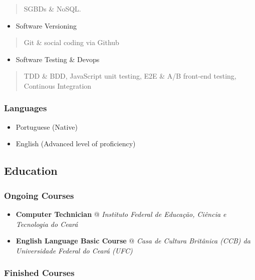 \documentclass[]{article}
\providecommand{\tightlist}{%
  \setlength{\itemsep}{0pt}\setlength{\parskip}{0pt}}
\begin{document}
\begin{quote}
SGBDs \& NoSQL.
\end{quote}

\begin{itemize}
\tightlist
\item
  Software Versioning
\end{itemize}

\begin{quote}
Git \& social coding via Github
\end{quote}

\begin{itemize}
\tightlist
\item
  Software Testing \& Devops
\end{itemize}

\begin{quote}
TDD \& BDD, JavaScript unit testing, E2E \& A/B front-end testing,
Continous Integration
\end{quote}

\subsubsection{Languages}\label{languages}

\begin{itemize}
\item
  Portuguese (Native)
\item
  English (Advanced level of proficiency)
\end{itemize}

\subsection{Education}\label{education}

\subsubsection{Ongoing Courses}\label{ongoing-courses}

\begin{itemize}
\item
  \textbf{Computer Technician} @ \emph{Instituto Federal de Educação,
  Ciência e Tecnologia do Ceará}
\item
  \textbf{English Language Basic Course} @ \emph{Casa de Cultura
  Britânica (CCB) da Universidade Federal do Ceará (UFC)}
\end{itemize}

\subsubsection{Finished Courses}\label{finished-courses}
\end{document}
